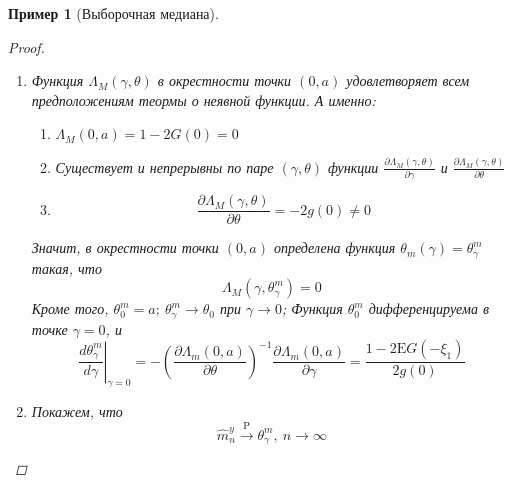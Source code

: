 \documentclass[12pt]{article}
\newtheorem*{example}{Пример}
\theoremstyle{basic_theorem}
\theoremstyle{name_theorem}
\def\eps{ \varepsilon }
\def\E{ \mathrm{E} }
\def\P{ \mathrm{P} }
\begin{document}
\begin{example}[Выборочная медиана]
\begin{proof}
\begin{enumerate}
            Найдем удобный вид для $\Lambda_M(\gamma,\theta)$. Имеем
            \begin{equation} \label{eq::lambda_transforming}
                \Lambda_M(\gamma,\theta)=\E(1-2I(y_1-\theta\leq0))=1-2\E I(\eps_1\leq\theta-a-z_1^\gamma\xi_1)=
                1-2\E G(\theta-a-z_1^\gamma\xi_1)
            \end{equation}
            так как $signx=1-2I(x<0),\ x\neq0$. Чтобы упростить \eqref{eq::lambda_transforming},
            введем две гипотезы $H_1=(z_1^\gamma=0)$ и $H_2=(z_2^\gamma=1)$.
            Тогда, используя задачу, получаем из \eqref{eq::lambda_transforming}:
            \[\Lambda_M(\gamma,\theta)=1-2(1-\gamma)G(\theta-a)-2\gamma\E G(\theta-a-\xi_1)\]
            Функция $\Lambda_M(\gamma,\theta)$ определена при всех $\gamma,\theta$.
            \item Функция $\Lambda_M(\gamma,\theta)$ в окрестности точки $(0,a)$ удовлетворяет
            всем предположениям теормы о неявной функции. А именно:
            \begin{enumerate}
                \item $\Lambda_M(0,a)=1-2G(0)=0$
                \item Существует и непрерывны по паре $(\gamma,\theta)$ функции
                $\frac{\partial\Lambda_M(\gamma,\theta)}{\partial\gamma}$ и $\frac{\partial\Lambda_M(\gamma,\theta)}{\partial\theta}$ 
                \item $$\frac{\partial\Lambda_M(\gamma,\theta)}{\partial\theta}=-2g(0)\neq0$$
            \end{enumerate}
            Значит, в окрестности точки $(0,a)$ определена функция $\theta_m(\gamma)=\theta_\gamma^m$ такая, что
            \[\Lambda_M(\gamma,\theta_\gamma^m)=0\]
            Кроме того, $\theta_0^m=a;\ \theta_\gamma^m\rightarrow\theta_0$ при $\gamma\rightarrow0$;
            Функция $\theta_0^m$ дифференцируема в точке $\gamma=0$, и
            \begin{equation} \label{eq::theta_func_derivative}
                \left.\frac{d\theta_\gamma^m}{d\gamma}\right\rvert_{\gamma=0}=-\left(\frac{\partial\Lambda_m(0,a)}{\partial\theta}\right)^{-1}\frac{\partial\Lambda_m(0,a)}{\partial\gamma}=\frac{1-2\E G(-\xi_1)}{2g(0)}
            \end{equation}
            \item Покажем, что
            \begin{equation} \label{eq::sample_median_p_conv}
                \widehat{m}_n^y\xrightarrow{\P}\theta_\gamma^m,\ n\rightarrow\infty

\end{equation}
\end{enumerate}
\end{proof}
\end{example}
\end{document}
